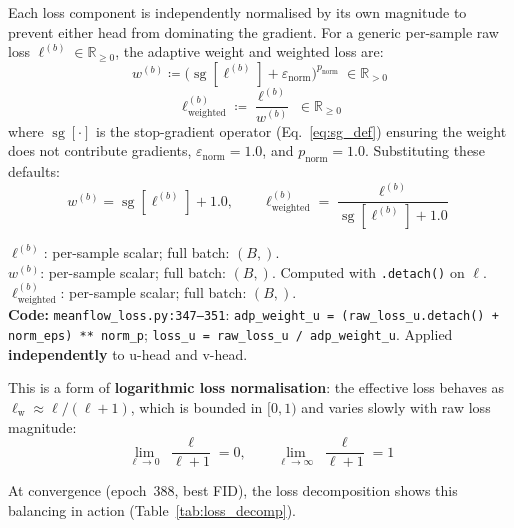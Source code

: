 \documentclass[11pt,a4paper]{article}
\newcommand{\code}[1]{\texttt{#1}}
\DeclareMathOperator{\sg}{sg}        %
\begin{document}
Each loss component is independently normalised by its own magnitude to prevent
either head from dominating the gradient.  For a generic per-sample raw loss
$\ell^{(b)} \in \mathbb{R}_{\ge 0}$, the adaptive weight and weighted loss
are:
\begin{equation}
  w^{(b)}
    \coloneqq \bigl(\sg[\ell^{(b)}] + \varepsilon_{\mathrm{norm}}\bigr)^{p_{\mathrm{norm}}}
    \;\in \mathbb{R}_{> 0}
  \label{eq:adaptive_weight}
\end{equation}
\begin{equation}
  \ell^{(b)}_{\mathrm{weighted}}
    \coloneqq \frac{\ell^{(b)}}{w^{(b)}}
    \;\in \mathbb{R}_{\ge 0}
  \label{eq:adaptive_weighted_loss}
\end{equation}
where $\sg[\cdot]$ is the stop-gradient operator (Eq.~\ref{eq:sg_def})
ensuring the weight does not contribute gradients, $\varepsilon_{\mathrm{norm}}
= 1.0$, and $p_{\mathrm{norm}} = 1.0$.  Substituting these defaults:
\begin{equation}
  w^{(b)} = \sg[\ell^{(b)}] + 1.0,
  \qquad
  \ell^{(b)}_{\mathrm{weighted}}
    = \frac{\ell^{(b)}}{\sg[\ell^{(b)}] + 1.0}
  \label{eq:adaptive_simplified}
\end{equation}
\begin{shapes}
$\ell^{(b)}$: per-sample scalar; full batch: $(B,)$.\\
$w^{(b)}$: per-sample scalar; full batch: $(B,)$. Computed with \code{.detach()} on $\ell$.\\
$\ell^{(b)}_{\mathrm{weighted}}$: per-sample scalar; full batch: $(B,)$.\\
\textbf{Code:} \code{meanflow\_loss.py:347--351}:
\code{adp\_weight\_u = (raw\_loss\_u.detach() + norm\_eps) ** norm\_p};
\code{loss\_u = raw\_loss\_u / adp\_weight\_u}.
Applied \textbf{independently} to u-head and v-head.
\end{shapes}

\noindent
This is a form of \textbf{logarithmic loss normalisation}: the effective loss
behaves as $\ell_\mathrm{w} \approx \ell/(\ell+1)$, which is bounded in
$[0,1)$ and varies slowly with raw loss magnitude:
\begin{equation}
  \lim_{\ell \to 0}\;\frac{\ell}{\ell + 1} = 0,
  \qquad
  \lim_{\ell \to \infty}\;\frac{\ell}{\ell + 1} = 1
\end{equation}

At convergence (epoch~388, best FID), the loss decomposition shows this
balancing in action (Table~\ref{tab:loss_decomp}).
\end{document}
